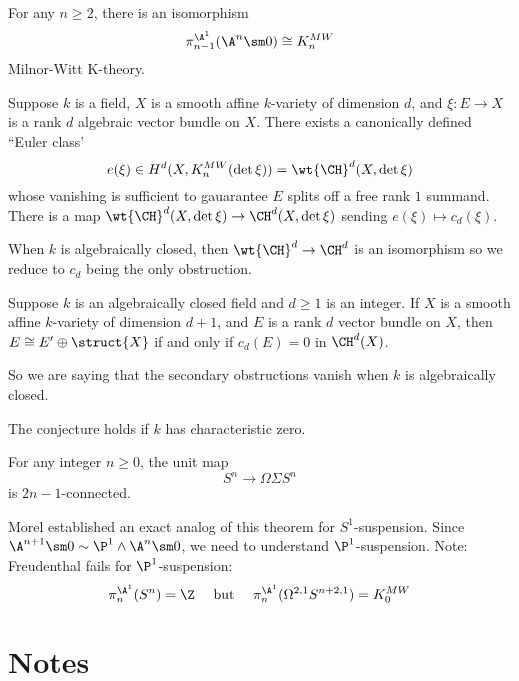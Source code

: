 \documentclass{article}
\begin{document}
\begin{theorem}[Morel]
For any $n \ge 2$, there is an isomorphism
\[ \pi_{n-1}^{\A^1}(\A^n \sm 0) \cong K_n^{MW} \]
Milnor-Witt K-theory. 
\end{theorem}

\begin{theorem}
Suppose $k$ is a field, $X$ is a smooth affine $k$-variety of dimension $d$, and $\xi : E \to X$ is a rank $d$ algebraic vector bundle on $X$. There exists a canonically defined ``Euler class'
\[ e(\xi) \in H^d(X, K_n^{MW}(\det{\xi})) = \wt{\CH}^d(X, \det{\xi}) \]
whose vanishing is sufficient to gauarantee $E$ splits off a free rank $1$ summand. There is a map $\wt{\CH}^d(X, \det{\xi}) \to \CH^d(X, \det{\xi})$ sending $e(\xi) \mapsto c_d(\xi)$. 
\end{theorem}

\begin{rmk}
When $k$ is algebraically closed, then $\wt{\CH}^d \to \CH^d$ is an isomorphism so we reduce to $c_d$ being the only obstruction.
\end{rmk}

\begin{conj}
Suppose $k$ is an algebraically closed field and $d \ge 1$ is an integer. If $X$ is a smooth affine $k$-variety of dimension $d + 1$, and $E$ is a rank $d$ vector bundle on $X$, then $E \cong E' \oplus \struct{X}$ if and only if $c_d(E) = 0$ in $\CH^d(X)$. 
\end{conj}

So we are saying that the secondary obstructions vanish when $k$ is algebraically closed. 

\begin{theorem}
The conjecture holds if $k$ has characteristic zero. 
\end{theorem}

\begin{theorem}
For any integer $n \ge 0$, the unit map
\[ S^n \to \Omega \Sigma S^n \]
is $2n - 1$-connected. 
\end{theorem}

Morel established an exact analog of this theorem for $S^1$-suspension. Since $\A^{n+1} \sm 0 \sim \P^1 \wedge \A^n \sm 0$, we need to understand $\P^1$-suspension. Note: Freudenthal fails for $\P^1$-suspension:
\[ \pi_n^{\A^1}(S^n) = \Z \quad \text{ but } \quad \pi_n^{\A^1}(\Omega^{2,1} S^{n+2,1}) = K_0^{MW} \]


\section{Notes}
\end{document}
